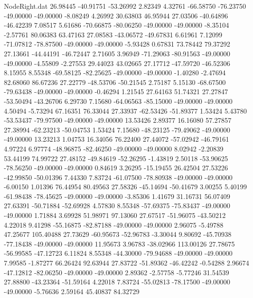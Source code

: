 \begin{filecontents}{NodeRight.dat}
  26.98445  -40.91751  -53.26992     2.82349    4.32761  -66.58750  -76.23750  -49.00000  -49.00000   -8.08249    4.26992   30.63803   46.95944
  27.03506  -40.64896  -46.42239     7.08517    5.61686  -70.66875  -80.06250  -49.00000  -49.00000   -8.35104   -2.57761   80.06383   63.47163
  27.08583  -43.06572  -49.67831     6.61961    7.12099  -71.07812  -78.87500  -49.00000  -49.00000   -5.93428    0.67831   73.78442   79.37292
  27.13661  -44.44191  -46.72447     2.71605    3.96949  -71.29063  -80.91563  -49.00000  -49.00000   -4.55809   -2.27553   29.44023   43.02665
  27.17712  -47.59720  -46.52306     8.15955    8.55348  -69.58125  -82.25625  -49.00000  -49.00000   -1.40280   -2.47694   82.68060   86.67236
  27.22779  -48.53706  -50.21545     2.75187    5.15130  -68.67500  -79.63438  -49.00000  -49.00000   -0.46294    1.21545   27.64163   51.74321
  27.27847  -53.50494  -43.26706     6.29730    7.15680  -64.06563  -85.15000  -49.00000  -49.00000    4.50494   -5.73294   67.16351   76.33044
  27.33937  -62.53426  -51.89377     1.53424    5.43780  -53.53437  -79.97500  -49.00000  -49.00000   13.53426    2.89377   16.16080   57.27857
  27.38994  -62.23213  -50.04753     1.53424    7.15680  -48.23125  -79.49062  -49.00000  -49.00000   13.23213    1.04753   16.34056   76.22400
  27.44072  -57.02942  -46.79161     4.97224    6.97774  -48.96875  -82.46250  -49.00000  -49.00000    8.02942   -2.20839   53.44199   74.99722
  27.48152  -49.84619  -52.26295    -1.43819    2.50118  -53.90625  -78.56250  -49.00000  -49.00000    0.84619    3.26295  -15.19455   26.42504
  27.53226  -42.99850  -50.01396     7.44330    7.83724  -61.07500  -78.80938  -49.00000  -49.00000   -6.00150    1.01396   76.44954   80.49563
  27.58326  -45.14694  -50.41679     3.00255    5.40199  -61.98438  -78.45625  -49.00000  -49.00000   -3.85306    1.41679   31.16731   56.07409
  27.63391  -50.71884  -52.69928     4.57830    8.55348  -57.69375  -75.83437  -49.00000  -49.00000    1.71884    3.69928   51.98971   97.13060
  27.67517  -51.96075  -43.50212     4.22018    9.41298  -55.16875  -82.87188  -49.00000  -49.00000    2.96075   -5.49788   47.25677  105.40488
  27.73629  -60.95673  -52.96783    -3.30044    9.80692  -45.70938  -77.18438  -49.00000  -49.00000   11.95673    3.96783  -38.02966  113.00126
  27.78675  -56.99585  -47.12723     6.11824    8.55348  -44.30000  -79.94688  -49.00000  -49.00000    7.99585   -1.87277   66.26424   92.63944
  27.83722  -51.89362  -46.42242    -0.54288    2.96674  -47.12812  -82.06250  -49.00000  -49.00000    2.89362   -2.57758   -5.77246   31.54539
  27.88800  -43.23364  -51.59164     4.22018    7.83724  -55.02813  -78.17500  -49.00000  -49.00000   -5.76636    2.59164   45.40837   84.32729

\end{filecontents}
